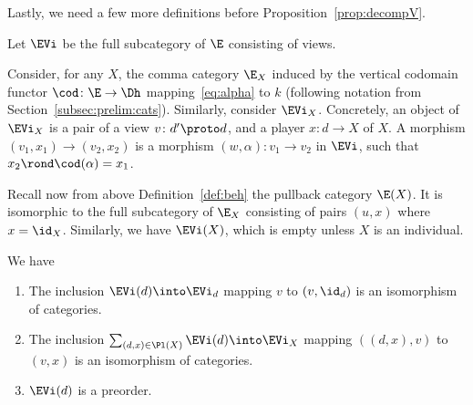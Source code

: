 \documentclass{LMCS}
\theoremstyle{plain}\newtheorem{satz}[thm]{Satz}
\begin{document}
Lastly, we need a few more definitions before
Proposition~\ref{prop:decompV}.
\begin{defi}
  Let $\EVi$ be the full subcategory of $\E$ consisting of views.
\end{defi}

Consider, for any $X$, the comma category $\E_X$ induced by the
vertical codomain functor $\cod \colon \E \to \Dh$
mapping~\eqref{eq:alpha} to $k$ (following notation from
Section~\ref{subsec:prelim:cats}).  Similarly, consider $\EVi_X$.
Concretely, an object of $\EVi_X$ is a pair of a view $v \colon d'
\proto d$, and a player $x \colon d \to X$ of $X$.  A morphism
$(v_1,x_1) \to (v_2,x_2)$ is a morphism $(w,\alpha) \colon v_1 \to
v_2$ in $\EVi$, such that $x_2 \rond \cod (\alpha) = x_1$.  

Recall now from above Definition~\ref{def:beh} the pullback category
$\E (X)$. It is isomorphic to the full subcategory of $\E_X$
consisting of pairs $(u,x)$ where $x = \id_X$.  Similarly, we have
$\EVi(X)$, which is empty unless $X$ is an individual.
   \begin{prop}\label{prop:decompV} We have
     \begin{enumerate}[label=(\roman*)]
     \item The inclusion $\EVi(d) \into \EVi_d$ mapping $v$ to 
       $(v, \id_d)$ is an isomorphism of categories. \label{prop:decompV:i}
     \item The inclusion $\sum_{(d,x) \in \Pl (X)} \EVi(d) \into
       \EVi_X$ mapping $((d,x),v)$ to $(v,x)$ is an isomorphism of
       categories.
       \label{prop:decompV:ii}
     \item $\EVi(d)$ is a preorder.\label{prop:decompV:iii}
     \end{enumerate}
\end{prop}
\end{document}
